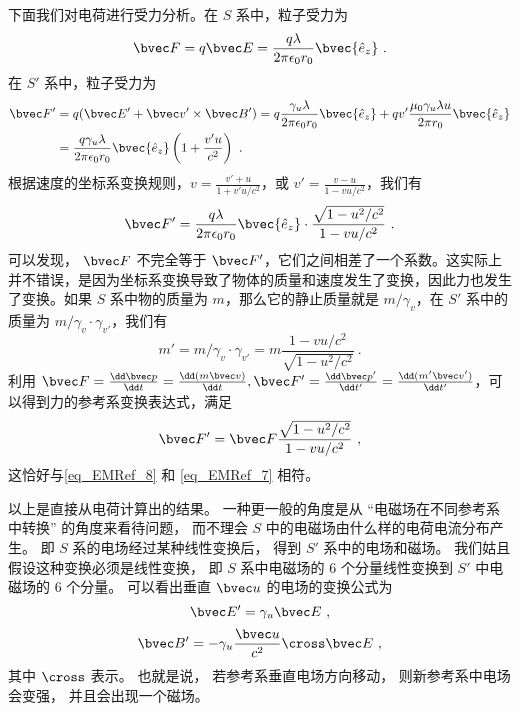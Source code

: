 下面我们对电荷进行受力分析。在 $S$ 系中，粒子受力为
\begin{equation}\label{eq_EMRef_8}
\bvec F=q\bvec E=\frac{q\lambda}{2\pi\epsilon_0 r_0} \bvec {\hat e_z}~.
\end{equation}
在 $S'$ 系中，粒子受力为
\begin{equation}
\begin{aligned}
\bvec F'&=q(\bvec E'+\bvec v'\times \bvec B')= q\frac{\gamma_u\lambda}{2\pi\epsilon_0 r_0} \bvec {\hat e_z}+qv'\frac{\mu_0\gamma_u \lambda u}{2\pi r_0} \bvec {\hat e_z}
\\
&=\frac{q\gamma_u\lambda}{2\pi\epsilon_0r_0}\bvec {\hat e_z}\left(1+\frac{v' u}{c^2}\right)~.
\end{aligned}
\end{equation}
根据速度的坐标系变换规则，$v=\frac{v'+u}{1+v'u/c^2}$，或 $v'=\frac{v-u}{1-vu/c^2}$，我们有
\begin{equation}\label{eq_EMRef_7}
\bvec F'=\frac{q\lambda}{2\pi\epsilon_0r_0}\bvec {\hat e_z} \cdot\frac{\sqrt{1-u^2/c^2}}{1-vu/c^2}~.
\end{equation}
可以发现， $\bvec F$ 不完全等于 $\bvec F'$，它们之间相差了一个系数。这实际上并不错误，是因为坐标系变换导致了物体的质量和速度发生了变换，因此力也发生了变换。如果 $S$ 系中物的质量为 $m$，那么它的静止质量就是 $m/\gamma_v$，在 $S'$ 系中的质量为 $m/\gamma_v \cdot \gamma_{v'}$，我们有
\begin{equation}
m'=m/\gamma_v\cdot \gamma_{v'}=m \frac{1-vu/c^2}{\sqrt{1-u^2/c^2}}~.
\end{equation}
利用 $\bvec F=\frac{\dd \bvec p}{\dd t}=\frac{\dd (m \bvec v)}{\dd t},\bvec F'=\frac{\dd \bvec p'}{\dd t'}=\frac{\dd (m'\bvec v')}{\dd t'}$，可以得到力的参考系变换表达式，满足
\begin{equation}
\bvec F'=\bvec F\frac{\sqrt{1-u^2/c^2}}{1-vu/c^2}~,
\end{equation}
这恰好与\autoref{eq_EMRef_8} 和 \autoref{eq_EMRef_7} 相符。


以上是直接从电荷计算出的结果。 一种更一般的角度是从 “电磁场在不同参考系中转换” 的角度来看待问题， 而不理会 $S$ 中的电磁场由什么样的电荷电流分布产生。 即 $S$ 系的电场经过某种线性变换后， 得到 $S'$ 系中的电场和磁场。 我们姑且假设这种变换必须是线性变换，%
即 $S$ 系中电磁场的 6 个分量线性变换到 $S'$ 中电磁场的 6 个分量。 可以看出垂直 $\bvec u$ 的电场的变换公式为
\begin{equation}\label{eq_EMRef_5}
\bvec E' = \gamma_u \bvec E~,
\end{equation}
\begin{equation}\label{eq_EMRef_6}
\bvec B' = -\gamma_u \frac{\bvec u}{c^2} \cross \bvec E~,
\end{equation}
其中 $\cross$ 表示。 也就是说， 若参考系垂直电场方向移动， 则新参考系中电场会变强， 并且会出现一个磁场。

